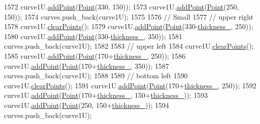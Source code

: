 \begin{DoxyCode}
1572     curve1U.\mbox{\hyperlink{class_bezier_curve_a38d16c18b36ae45619b05e26e226cf34}{addPoint}}(\mbox{\hyperlink{class_point}{Point}}(330, 150));
1573     curve1U.\mbox{\hyperlink{class_bezier_curve_a38d16c18b36ae45619b05e26e226cf34}{addPoint}}(\mbox{\hyperlink{class_point}{Point}}(250, 150));
1574     curves.push\_back(curve1U);
1575 
1576     \textcolor{comment}{// Small}
1577     \textcolor{comment}{// upper right}
1578     curve1U.\mbox{\hyperlink{class_bezier_curve_a0ba8ce66d5af5971ae6a1b506029728e}{clearPoints}}();
1579     curve1U.\mbox{\hyperlink{class_bezier_curve_a38d16c18b36ae45619b05e26e226cf34}{addPoint}}(\mbox{\hyperlink{class_point}{Point}}(330-\mbox{\hyperlink{class_font_v1_aed8040e76be9a52833627b92f0fb4e5f}{thickness\_}}, 250));
1580     curve1U.\mbox{\hyperlink{class_bezier_curve_a38d16c18b36ae45619b05e26e226cf34}{addPoint}}(\mbox{\hyperlink{class_point}{Point}}(330-\mbox{\hyperlink{class_font_v1_aed8040e76be9a52833627b92f0fb4e5f}{thickness\_}}, 350));
1581     curves.push\_back(curve1U);
1582 
1583     \textcolor{comment}{// upper left}
1584     curve1U.\mbox{\hyperlink{class_bezier_curve_a0ba8ce66d5af5971ae6a1b506029728e}{clearPoints}}();
1585     curve1U.\mbox{\hyperlink{class_bezier_curve_a38d16c18b36ae45619b05e26e226cf34}{addPoint}}(\mbox{\hyperlink{class_point}{Point}}(170+\mbox{\hyperlink{class_font_v1_aed8040e76be9a52833627b92f0fb4e5f}{thickness\_}}, 250));
1586     curve1U.\mbox{\hyperlink{class_bezier_curve_a38d16c18b36ae45619b05e26e226cf34}{addPoint}}(\mbox{\hyperlink{class_point}{Point}}(170+\mbox{\hyperlink{class_font_v1_aed8040e76be9a52833627b92f0fb4e5f}{thickness\_}}, 350));
1587     curves.push\_back(curve1U);
1588 
1589     \textcolor{comment}{// bottom left}
1590     curve1U.\mbox{\hyperlink{class_bezier_curve_a0ba8ce66d5af5971ae6a1b506029728e}{clearPoints}}();
1591     curve1U.\mbox{\hyperlink{class_bezier_curve_a38d16c18b36ae45619b05e26e226cf34}{addPoint}}(\mbox{\hyperlink{class_point}{Point}}(170+\mbox{\hyperlink{class_font_v1_aed8040e76be9a52833627b92f0fb4e5f}{thickness\_}}, 250));
1592     curve1U.\mbox{\hyperlink{class_bezier_curve_a38d16c18b36ae45619b05e26e226cf34}{addPoint}}(\mbox{\hyperlink{class_point}{Point}}(170+\mbox{\hyperlink{class_font_v1_aed8040e76be9a52833627b92f0fb4e5f}{thickness\_}}, 150+\mbox{\hyperlink{class_font_v1_aed8040e76be9a52833627b92f0fb4e5f}{thickness\_}}));
1593     curve1U.\mbox{\hyperlink{class_bezier_curve_a38d16c18b36ae45619b05e26e226cf34}{addPoint}}(\mbox{\hyperlink{class_point}{Point}}(250, 150+\mbox{\hyperlink{class_font_v1_aed8040e76be9a52833627b92f0fb4e5f}{thickness\_}}));
1594     curves.push\_back(curve1U);

\end{DoxyCode}

